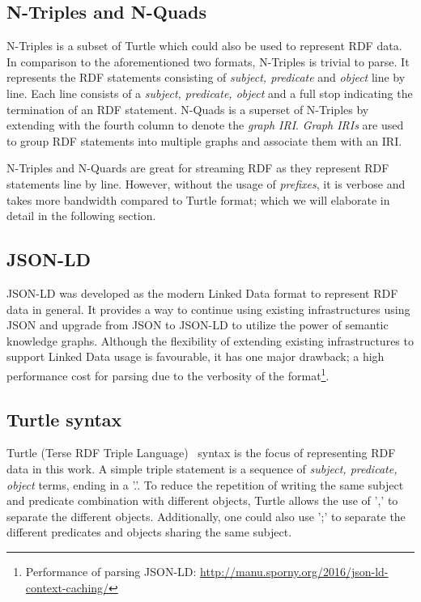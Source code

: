 \subsection{N-Triples and N-Quads}
N-Triples\cite{N-Triples} is a subset of Turtle which could also be used 
to represent RDF data. In comparison to the aforementioned two formats, N-Triples is trivial to parse. 
It represents the RDF statements consisting of \emph{subject, predicate} and \emph{object} line by line. 
Each line consists of a \emph{subject, predicate, object} and a full stop indicating the termination of 
an RDF statement. N-Quads is a superset  of N-Triples by extending with the fourth column to denote the \emph{graph IRI}.
\emph{Graph IRIs} are used to group RDF statements into multiple graphs and associate them with an IRI.  

N-Triples and N-Quards are great for streaming RDF as they 
represent RDF statements line by line. However, without the usage of \emph{prefixes}, it is verbose and takes more 
bandwidth compared to Turtle format; which we will elaborate in detail in the following section.


\subsection{JSON-LD}
JSON-LD\cite{JSON-LD} was developed as 
the modern Linked Data format to represent RDF data in general. 
It provides a way to continue using existing 
infrastructures using JSON and upgrade from JSON to JSON-LD to utilize the power of semantic knowledge graphs. 
Although the flexibility of extending existing infrastructures to support Linked Data usage 
is favourable, it has one major drawback; a high performance cost for parsing due to 
the verbosity of the format\footnote{Performance of parsing JSON-LD: \url{http://manu.sporny.org/2016/json-ld-context-caching/}}.


\subsection{Turtle syntax}
\label{sec:turtle_syntax}
Turtle (Terse RDF Triple Language)~\cite{turtle_syntax}
syntax is the focus of representing RDF data in this work.
 A simple triple statement is a sequence of
\textit{subject, predicate, object} terms, ending in a '.'.
To reduce the repetition of writing the same subject and predicate combination with
different objects, Turtle allows the use of ',' to separate the different objects.
Additionally, one could also use ';' to separate the different predicates and objects sharing the
same subject. 


